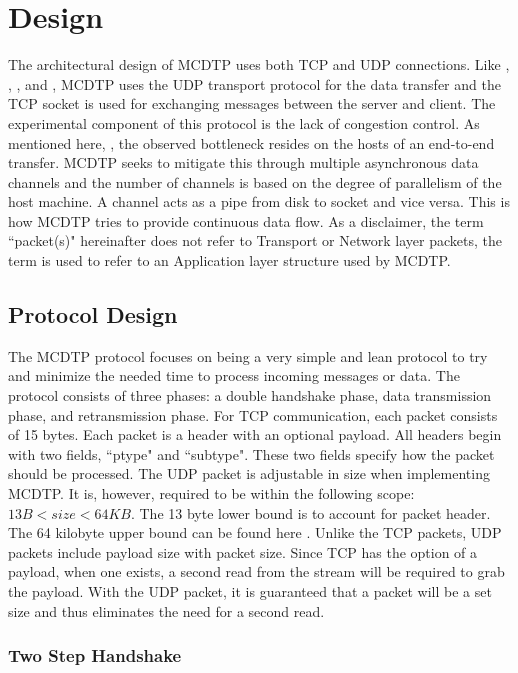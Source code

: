 \chapter{Design}

The architectural design of MCDTP uses both TCP and UDP connections. Like \cite{Meiss2007}, \cite{He2002}, \cite{Aspera2016}, and \cite{Fan2010}, MCDTP uses the UDP transport protocol for the data transfer and the TCP socket is used for exchanging messages between the server and client. The experimental component of this protocol is the lack of congestion control. As mentioned here, \cite{Aspera2016} \cite{Fan2010}, the observed bottleneck resides on the hosts of an end-to-end transfer. MCDTP seeks to mitigate this through multiple asynchronous data channels and the number of channels is based on the degree of parallelism of the host machine. A channel acts as a pipe from disk to socket and vice versa. This is how MCDTP tries to provide continuous data flow. As a disclaimer, the term ``packet(s)" hereinafter does not refer to Transport or Network layer packets, the term is used to refer to an Application layer structure used by MCDTP.

\section{Protocol Design}

The MCDTP protocol focuses on being a very simple and lean protocol to try and minimize the needed time to process incoming messages or data. The protocol consists of three phases: a double handshake phase, data transmission phase, and retransmission phase. For TCP communication, each packet consists of 15 bytes. Each packet is a header with an optional payload. All headers begin with two fields, ``ptype" and ``subtype". These two fields specify how the packet should be processed. The UDP packet is adjustable in size when implementing MCDTP. It is, however, required to be within the following scope: $13B < size < 64KB$. The 13 byte lower bound is to account for packet header. The 64 kilobyte upper bound can be found here \cite{postel1981ip}. Unlike the TCP packets, UDP packets include payload size with packet size. Since TCP has the option of a payload, when one exists, a second read from the stream will be required to grab the payload. With the UDP packet, it is guaranteed that a packet will be a set size and thus eliminates the need for a second read.

\subsection{Two Step Handshake}

